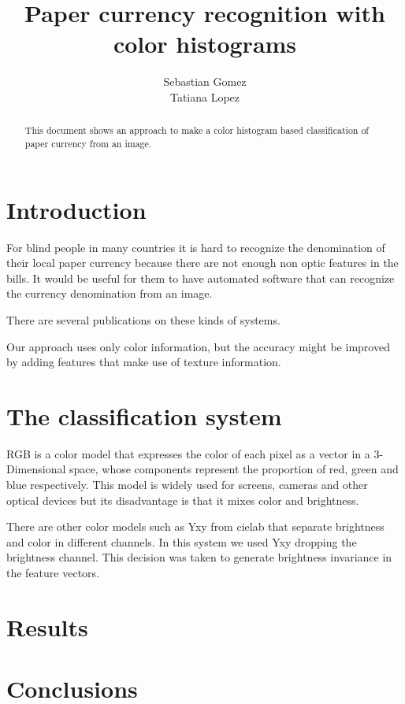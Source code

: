 \documentclass{article}
\begin{document}
\title{Paper currency recognition with color histograms}
\author{Sebastian Gomez \\ Tatiana Lopez}
\maketitle

\begin{abstract}
This document shows an approach to make a color histogram based classification of paper currency from an image.
\end{abstract}

\section{Introduction}
For blind people in many countries it is hard to recognize the denomination of their local paper currency because
there are not enough non optic features in the bills. It would be useful for them to have automated software that
can recognize the currency denomination from an image.

There are several publications on these kinds of systems. %

Our approach uses only color information, but the accuracy might be improved by adding features that make use of
texture information.

\section{The classification system}

RGB is a color model that expresses the color of each pixel as a vector in a 3-Dimensional space, whose components
represent the proportion of red, green and blue respectively. This model is widely used for screens, cameras and
other optical devices but its disadvantage is that it mixes color and brightness.

There are other color models such as Yxy from cielab that separate brightness and color in different channels. In
this system we used Yxy dropping the brightness channel. This decision was taken to generate brightness invariance
in the feature vectors. %


\section{Results}

\section{Conclusions}
\end{document}
